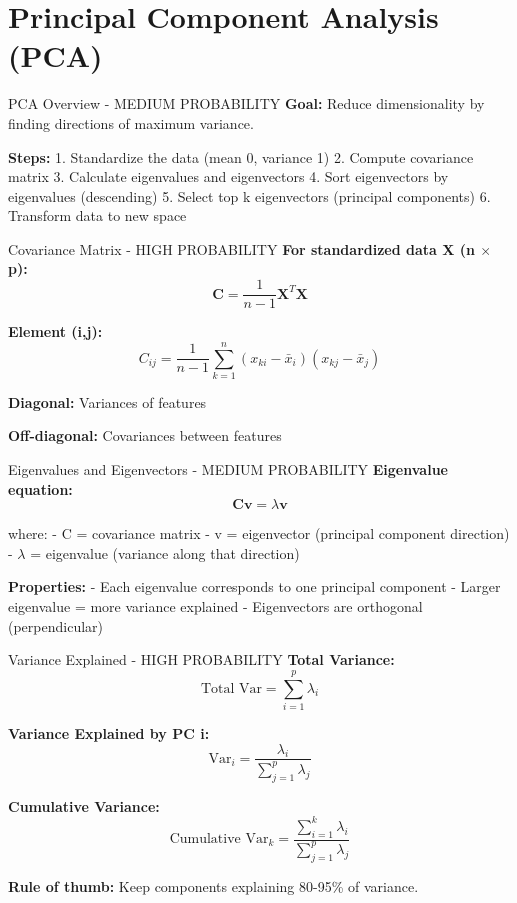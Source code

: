 \documentclass[11pt]{article}
\begin{document}

\section{Principal Component Analysis (PCA)}

\begin{important}{PCA Overview - MEDIUM PROBABILITY}
\textbf{Goal:} Reduce dimensionality by finding directions of maximum variance.

\textbf{Steps:}
1. Standardize the data (mean 0, variance 1)
2. Compute covariance matrix
3. Calculate eigenvalues and eigenvectors
4. Sort eigenvectors by eigenvalues (descending)
5. Select top k eigenvectors (principal components)
6. Transform data to new space
\end{important}

\begin{important}{Covariance Matrix - HIGH PROBABILITY}
\textbf{For standardized data X (n $\times$ p):}
\[\mathbf{C} = \frac{1}{n-1}\mathbf{X}^T\mathbf{X}\]

\textbf{Element (i,j):}
\[C_{ij} = \frac{1}{n-1}\sum_{k=1}^{n}(x_{ki} - \bar{x}_i)(x_{kj} - \bar{x}_j)\]

\textbf{Diagonal:} Variances of features

\textbf{Off-diagonal:} Covariances between features
\end{important}

\begin{important}{Eigenvalues and Eigenvectors - MEDIUM PROBABILITY}
\textbf{Eigenvalue equation:}
\[\mathbf{C}\mathbf{v} = \lambda\mathbf{v}\]

where:
- C = covariance matrix
- v = eigenvector (principal component direction)
- $\lambda$ = eigenvalue (variance along that direction)

\textbf{Properties:}
- Each eigenvalue corresponds to one principal component
- Larger eigenvalue = more variance explained
- Eigenvectors are orthogonal (perpendicular)
\end{important}

\begin{important}{Variance Explained - HIGH PROBABILITY}
\textbf{Total Variance:}
\[\text{Total Var} = \sum_{i=1}^{p} \lambda_i\]

\textbf{Variance Explained by PC i:}
\[\text{Var}_i = \frac{\lambda_i}{\sum_{j=1}^{p} \lambda_j}\]

\textbf{Cumulative Variance:}
\[\text{Cumulative Var}_k = \frac{\sum_{i=1}^{k} \lambda_i}{\sum_{j=1}^{p} \lambda_j}\]

\textbf{Rule of thumb:} Keep components explaining 80-95\% of variance.
\end{important}
\end{document}
